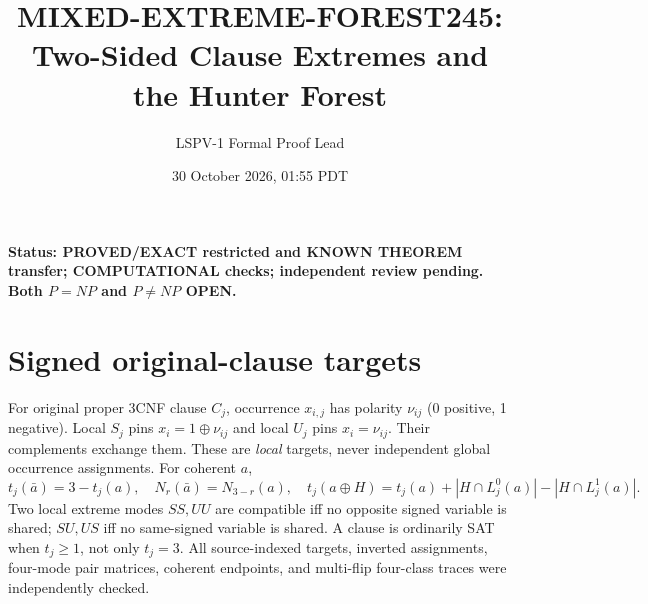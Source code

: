 \documentclass[10pt]{article}
\title{MIXED-EXTREME-FOREST245: Two-Sided Clause Extremes and the Hunter Forest}
\author{LSPV-1 Formal Proof Lead}
\date{30 October 2026, 01:55 PDT}
\begin{document}
\maketitle
\noindent \textbf{Status: PROVED/EXACT restricted and KNOWN THEOREM transfer; COMPUTATIONAL checks; independent review pending. Both $P=NP$ and $P\ne NP$ OPEN.}
\section{Signed original-clause targets}
For original proper 3CNF clause $C_j$, occurrence $x_{i,j}$ has polarity $\nu_{ij}$ (0 positive, 1 negative). Local $S_j$ pins $x_i=1\oplus\nu_{ij}$ and local $U_j$ pins $x_i=\nu_{ij}$. Their complements exchange them. These are \emph{local} targets, never independent global occurrence assignments. For coherent $a$,
\[
t_j(\bar a)=3-t_j(a),\quad N_r(\bar a)=N_{3-r}(a),\quad
t_j(a\oplus H)=t_j(a)+|H\cap L_j^0(a)|-|H\cap L_j^1(a)|.
\]
Two local extreme modes $SS,UU$ are compatible iff no opposite signed variable is shared; $SU,US$ iff no same-signed variable is shared. A clause is ordinarily SAT when $t_j\ge1$, not only $t_j=3$. All source-indexed targets, inverted assignments, four-mode pair matrices, coherent endpoints, and multi-flip four-class traces were independently checked.
\end{document}
